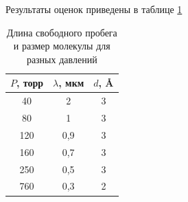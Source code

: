 \documentclass[12pt]{article}
\begin{document}
	Результаты оценок приведены в таблице \ref{tb:lambda_d}
	
	\begin{table}[!h]
		\caption{Длина свободного пробега и размер молекулы для разных давлений}
		\label{tb:lambda_d}
		\begin{center}
			\begin{tabular}{|c|c|c|}
				\hline
				$P$, торр & $\lambda$, мкм & $d$, \AA \\
				\hline
				40 & 2 & 3 \\
				80 & 1 & 3 \\
				120 & 0,9 & 3 \\
				160 & 0,7 & 3 \\
				250 & 0,5 & 3 \\
				760 & 0,3 & 2 \\
				\hline
			\end{tabular}
		\end{center}
	\end{table}
	
\end{document}
